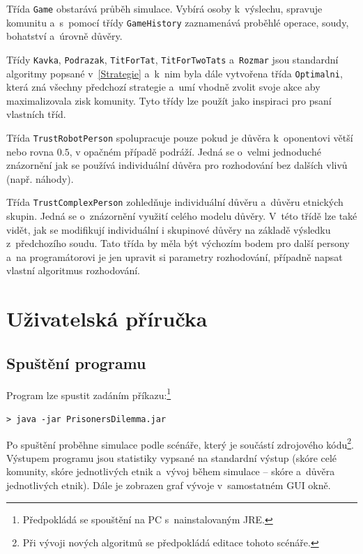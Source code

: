 \documentclass[pdftex,a4paper,12pt]{extarticle}
\begin{document}
Třída \texttt{Game} obstarává průběh simulace. Vybírá osoby k~výslechu, spravuje komunitu a~s~pomocí třídy \texttt{GameHistory} zaznamenává proběhlé operace, soudy, bohatství a~úrovně důvěry.

Třídy \texttt{Kavka}, \texttt{Podrazak}, \texttt{TitForTat}, \texttt{TitForTwoTats} a~\texttt{Rozmar} jsou standardní algoritmy popsané v~\ref{Strategie} a~k~nim byla dále vytvořena třída \texttt{Optimalni}, která zná všechny předchozí strategie a~umí vhodně zvolit svoje akce aby maximalizovala zisk komunity. Tyto třídy lze použít jako inspiraci pro psaní vlastních tříd.

Třída \texttt{TrustRobotPerson} spolupracuje pouze pokud je důvěra k~oponentovi větší nebo rovna $0.5$, v opačném případě podráží. Jedná se o~velmi jednoduché znázornění jak se používá individuální důvěra pro rozhodování bez dalších vlivů (např. náhody).

Třída \texttt{TrustComplexPerson} zohledňuje individuální důvěru a~důvěru etnických skupin. Jedná se o~znázornění využití celého modelu důvěry. V~této třídě lze také vidět, jak se modifikují individuální i skupinové důvěry na základě výsledku z~předchozího soudu. Tato třída by měla být výchozím bodem pro další persony a~na programátorovi je jen upravit si parametry rozhodování, případně napsat vlastní algoritmus rozhodování.

\newpage
\section{Uživatelská příručka}
\label{Uživatelská příručka}

\subsection{Spuštění programu}
\label{Spuštění}
Program lze spustit zadáním příkazu:\footnote{Předpokládá se spouštění na PC s~nainstalovaným JRE.}

\vspace{2mm}
\texttt{> java -jar PrisonersDilemma.jar}
\vspace{2mm}

Po spuštění proběhne simulace podle scénáře, který je součástí zdrojového kódu\footnote{Při vývoji nových algoritmů se předpokládá editace tohoto scénáře.}. Výstupem programu jsou statistiky vypsané na standardní výstup (skóre celé komunity, skóre jednotlivých etnik a~vývoj během simulace -- skóre a~důvěra jednotlivých etnik). Dále je zobrazen graf vývoje v~samostatném GUI okně.
\end{document}
